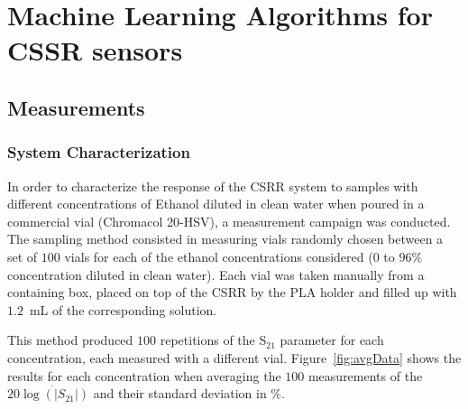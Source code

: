\documentclass[journal,twoside,web]{ieeecolor}
\begin{document}
\section{Machine Learning Algorithms for CSSR sensors}
\label{sec:mlCSRRs}

\subsection{Measurements}
\label{ssec:mlMeasurement}
\subsubsection{System Characterization}
\label{sssec:sysCharac}
In order to characterize the response of the CSRR system to samples with different concentrations of Ethanol diluted in clean water when poured in a commercial vial (Chromacol 20-HSV), a measurement campaign was conducted. The sampling method consisted in measuring vials randomly chosen between a set of $100$ vials for each of the ethanol concentrations considered ($0$ to $96\%$ concentration diluted in clean water). Each vial was taken manually from a containing box, placed on top of the CSRR by the PLA holder and filled up with $1.2$~mL of the corresponding solution.  

This method produced $100$ repetitions of the S$_{21}$ parameter for each concentration, each measured with a different vial. Figure~\ref{fig:avgData} shows the results for each concentration when averaging the $100$ measurements of the $20\dot{\log\left(|S_{21}|\right)}$ and their standard deviation in $\%$.  
\end{document}
